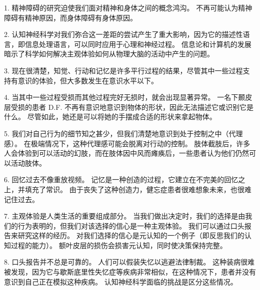 1. 精神障碍的研究迫使我们面对精神和身体之间的概念鸿沟。
不再可能认为精神障碍有精神原因，而身体障碍有身体原因。


2. 认知神经科学对我们弥合这一差距的尝试产生了重大影响，因为它的描述性语言，即信息处理语言，可以同时应用于心理和神经过程。
信息论和计算机的发展暗示了科学如何解决主观体验如何从物理大脑的活动中产生的问题。


3. 现在很清楚，知觉、行动和记忆是许多平行过程的结果，尽管其中一些过程支持有意识的体验，但大多数发生在意识水平以下。 


4. 当其中一些过程受损而其他过程完好无损时，就会出现显著异常。
一名下颞皮层受损的患者 D.F. 不再有意识地意识到物体的形状，因此无法描述它或识别它是什么。
尽管如此，她还是可以将她的手摆成合适的形状来拿起物体。


5. 我们对自己行为的细节知之甚少，但我们清楚地意识到处于控制之中（代理感）。
在极端情况下，这种代理感可能会脱离对行动的控制。
肢体截肢后，许多人会体验到可以活动的幻肢，而在肢体因中风而瘫痪后，一些患者认为他们仍然可以活动肢体。
 

6. 回忆过去不像重放视频。
记忆是一种创造的过程，它建立在不完美的回忆之上，并填充了常识。
由于丧失了这种创造力，健忘症患者很难想象未来，也很难记住过去。


7. 主观体验是人类生活的重要组成部分。
当我们做出决定时，我们的选择是由我们的行为表明的，但我们对该选择的信心是一种主观体验。
我们可以通过口头报告来研究这样的经历。
对我们选择的信心是元认知的一个例子（即反思我们的认知过程的能力）。
额叶皮层的损伤会损害元认知，同时使决策保持完整。 


8. 口头报告并不总是可靠的。
人们可以假装失忆以逃避法律制裁。
这种装病很难被发现，因为它与歇斯底里性失忆症等疾病非常相似，在这种情况下，患者并没有意识到自己正在模拟这种疾病。
认知神经科学面临的挑战是区分这些情况。

